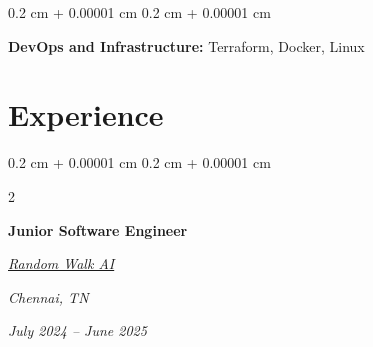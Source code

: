 \documentclass[10pt, letterpaper]{article}
\newenvironment{onecolentry}{
    \begin{adjustwidth}{
        0.2 cm + 0.00001 cm
    }{
        0.2 cm + 0.00001 cm
    }
}{
    \end{adjustwidth}
} %
\newenvironment{twocolentry}[2][]{
    \onecolentry
    \def\secondColumn{#2}
    \setcolumnwidth{\fill, 4.5 cm}
    \begin{paracol}{2}
}{
    \switchcolumn\raggedleft\secondColumn
    \end{paracol}
    \endonecolentry
} %
\let\hrefWithoutArrow\href
\renewcommand{\href}[2]{\hrefWithoutArrow{#1}{\ifthenelse{\equal{#2}{}}{ }{#2 }\raisebox{.15ex}{\footnotesize \faExternalLink*}}}
\begin{document}
\begin{onecolentry}
    \textbf{DevOps and Infrastructure:} Terraform, Docker, Linux
\end{onecolentry}
\vspace{0.10cm}


\section{Experience}

\begin{twocolentry}{
        \textit{Chennai, TN}

        \textit{July 2024 – June 2025}}
    \textbf{Junior Software Engineer}

    \textit{{\hrefWithoutArrow{https://randomwalk.ai/}{\color{black}\hspace*{0.13cm}Random Walk AI}}}
\end{twocolentry}
\end{document}
